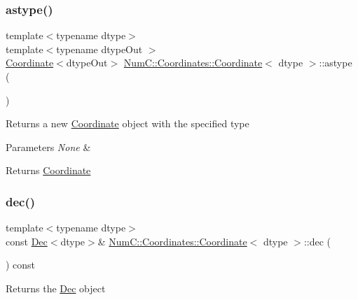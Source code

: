 \subsubsection{\texorpdfstring{astype()}{astype()}}
{\footnotesize\ttfamily template$<$typename dtype$>$ \\
template$<$typename dtype\+Out $>$ \\
\mbox{\hyperlink{class_num_c_1_1_coordinates_1_1_coordinate}{Coordinate}}$<$dtype\+Out$>$ \mbox{\hyperlink{class_num_c_1_1_coordinates_1_1_coordinate}{Num\+C\+::\+Coordinates\+::\+Coordinate}}$<$ dtype $>$\+::astype (\begin{DoxyParamCaption}{ }\end{DoxyParamCaption})\hspace{0.3cm}{\ttfamily [inline]}}

Returns a new \mbox{\hyperlink{class_num_c_1_1_coordinates_1_1_coordinate}{Coordinate}} object with the specified type


\begin{DoxyParams}{Parameters}
{\em None} & \\
\hline
\end{DoxyParams}
\begin{DoxyReturn}{Returns}
\mbox{\hyperlink{class_num_c_1_1_coordinates_1_1_coordinate}{Coordinate}} 
\end{DoxyReturn}
\mbox{\label{class_num_c_1_1_coordinates_1_1_coordinate_a04bccaa7463caf0b0222b3c667c38595}} 
\subsubsection{\texorpdfstring{dec()}{dec()}}
{\footnotesize\ttfamily template$<$typename dtype$>$ \\
const \mbox{\hyperlink{class_num_c_1_1_coordinates_1_1_dec}{Dec}}$<$dtype$>$\& \mbox{\hyperlink{class_num_c_1_1_coordinates_1_1_coordinate}{Num\+C\+::\+Coordinates\+::\+Coordinate}}$<$ dtype $>$\+::dec (\begin{DoxyParamCaption}{ }\end{DoxyParamCaption}) const\hspace{0.3cm}{\ttfamily [inline]}}

Returns the \mbox{\hyperlink{class_num_c_1_1_coordinates_1_1_dec}{Dec}} object


